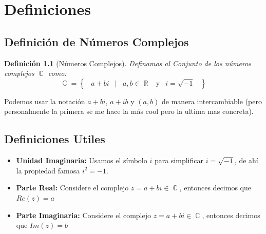 \documentclass[12pt, fleqn]{report}                             %
\DeclareMathOperator \Space {\quad}                             %
\DeclareMathOperator \MiniSpace {\;}                            %
\newcommand \Such {\MiniSpace|\MiniSpace}                       %
\newcommand \Also {\MiniSpace \text{y} \MiniSpace}              %
\newtheorem{Definition}{Definición}[section]                    %
\newcommand{\Set}[1]{\left\{ \MiniSpace #1 \MiniSpace \right\}} %
\DeclareMathOperator \Reals     {\mathbb{R}}                     %
\DeclareMathOperator \Complexs  {\mathbb{C}}                     %
\begin{document}
    \chapter{Definiciones}

        \clearpage
        \section{Definición de Números Complejos}

            \begin{Definition}[Números Complejos]
            \label{NumerosComplejos}
                Definamos al Conjunto de los números complejos $\Complexs$ como:
                \begin{equation}
                    \Complexs = 
                        \Set{ a + bi \Such a,b \in \Reals \Also i = \sqrt{-1} }
                \end{equation}

            \end{Definition}


            Podemos usar la notación $a+bi$, $a+ib$ y $(a, b)$ de manera intercambiable (pero personalmente 
            la primera se me hace la más cool pero la ultima mas concreta).


        \section{Definiciones Utiles} 

            \begin{itemize}
                \item \textbf{Unidad Imaginaria:}
                    Usamos el símbolo $i$ para simplificar $i = \sqrt{-1}$, de ahí la propiedad
                    famosa $i^2 = -1$.

                \item \textbf{Parte Real:}
                    Considere el complejo $z = a+bi \in \Complexs$, entonces decimos que $Re(z) = a$

                \item \textbf{Parte Imaginaria:}
                    Considere el complejo $z = a+bi \in \Complexs$, entonces decimos que $Im(z) = b$
            \end{itemize}
\end{document}
